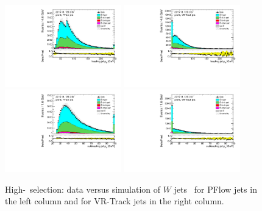 \documentclass[letterpaper,12pt]{article}
\begin{document}
\begin{figure}[!h]
	\centering
	\includegraphics[width=0.45\textwidth]{FTAG_plots/pretagNoRwnewonlyPFlowall/DataMC_h_J0_pt.pdf}
	\includegraphics[width=0.45\textwidth]{FTAG_plots/pretagNoRwnewonlyVRJetsall/DataMC_h_J0_pttrackjet.pdf}\\
	\includegraphics[width=0.45\textwidth]{FTAG_plots/pretagNoRwnewonlyPFlowall/DataMC_h_J1_pt.pdf}
	\includegraphics[width=0.45\textwidth]{FTAG_plots/pretagNoRwnewonlyVRJetsall/DataMC_h_J1_pttrackjet.pdf}\\
	\caption{High-\pt\ selection: data versus simulation of $W$ jets \pt\ for 
	PFlow jets in the left column and for VR-Track jets in the right column.}
	\label{fig:kinematic_distributions_highpT}
\end{figure}
	
\end{document}
